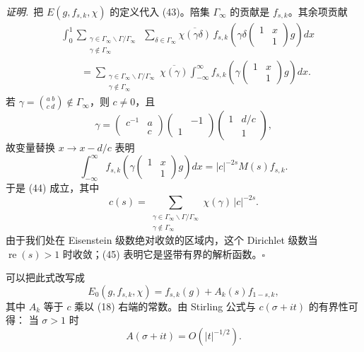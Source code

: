 \smallskip
\noindent\emph{证明.}\ 把 $E(g,f_{s,k},\chi)$ 的定义代入 (43)。陪集 $\Gamma_{\infty}$
的贡献是 $f_{s,k}$。其余项贡献
\[
\begin{aligned}
&\int_{0}^{1}\sum_{\substack{\gamma\in\Gamma_{\infty}\backslash\Gamma/\Gamma_{\infty}\\
\gamma\notin\Gamma_{\infty}}}\ \sum_{\delta\in\Gamma_{\infty}}
\overline{\chi(\gamma\delta)}\,f_{s,k}\left(\gamma\delta
\begin{pmatrix}1&x\\&1\end{pmatrix}g\right)dx\\
&\qquad=\sum_{\substack{\gamma\in\Gamma_{\infty}\backslash\Gamma/\Gamma_{\infty}\\
\gamma\notin\Gamma_{\infty}}}\overline{\chi(\gamma)}
\int_{-\infty}^{\infty}f_{s,k}\left(\gamma
\begin{pmatrix}1&x\\&1\end{pmatrix}g\right)dx .
\end{aligned}
\]
若 $\gamma=\binom{a\ b}{c\ d}\notin\Gamma_{\infty}$，则 $c\neq0$，且
\[
\gamma=\begin{pmatrix}c^{-1}&a\\&c\end{pmatrix}
\begin{pmatrix}&-1\\1&\end{pmatrix}
\begin{pmatrix}1&d/c\\&1\end{pmatrix},
\]
故变量替换 $x\to x-d/c$ 表明
\[
\int_{-\infty}^{\infty}f_{s,k}\left(\gamma
\begin{pmatrix}1&x\\&1\end{pmatrix}g\right)dx=|c|^{-2s}M(s)f_{s,k}.
\]
于是 (44) 成立，其中
\begin{equation}\tag{45}
c(s)=\sum_{\substack{\gamma\in\Gamma_{\infty}\backslash\Gamma/\Gamma_{\infty}\\
\gamma\notin\Gamma_{\infty}}}\chi(\gamma)\,|c|^{-2s}.
\end{equation}
由于我们处在 Eisenstein 级数绝对收敛的区域内，这个 Dirichlet 级数当 $\operatorname{re}(s)>1$
时收敛；(45) 表明它是竖带有界的解析函数。\hfill$\square$

可以把此式改写成
\begin{equation}\tag{46}
E_{0}(g,f_{s,k},\chi)=f_{s,k}(g)+A_{k}(s)f_{1-s,k},
\end{equation}
其中 $A_{k}$ 等于 $c$ 乘以 (18) 右端的常数。由 Stirling 公式与 $c(\sigma+it)$ 的有界性可得：
当 $\sigma>1$ 时
\[
A(\sigma+it)=O(|t|^{-1/2}).
\]

